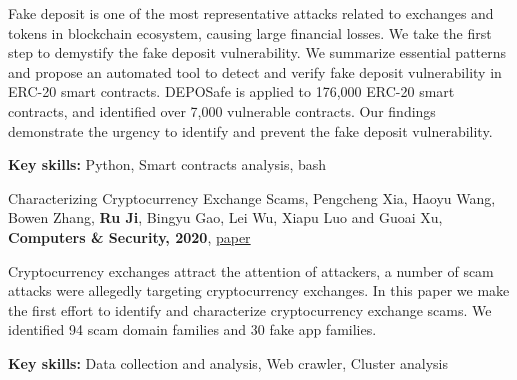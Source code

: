 \documentclass[letterpaper,10pt]{article}
\begin{document}
        Fake deposit is one of the most representative attacks related to exchanges and tokens in blockchain ecosystem, causing large financial losses. We take the first step to demystify the fake deposit vulnerability. We summarize essential patterns and propose an automated tool to detect and verify fake deposit vulnerability in ERC-20 smart contracts. DEPOSafe is applied to 176,000 ERC-20 smart contracts, and identified over 7,000 vulnerable contracts. Our findings demonstrate the urgency to identify and prevent the fake deposit vulnerability.
        
        \textbf{Key skills:} Python, Smart contracts analysis, bash
        
        \vspace{-5pt}
        \item{Characterizing Cryptocurrency Exchange Scams, Pengcheng Xia, Haoyu Wang, Bowen Zhang, \textbf{Ru Ji}, Bingyu Gao, Lei Wu, Xiapu Luo and Guoai Xu, \textbf{Computers \& Security, 2020}, \href{https://www.sciencedirect.com/science/article/abs/pii/S0167404820302662}{\textcolor{linkblue}{paper}}}
        
        Cryptocurrency exchanges attract the attention of attackers, a number of scam attacks were allegedly targeting cryptocurrency exchanges. In this paper we make the first effort to identify and characterize cryptocurrency exchange scams. We identified 94 scam domain families and 30 fake app families.
        
        \textbf{Key skills:} Data collection and analysis, Web crawler, Cluster analysis
        
\end{document}

